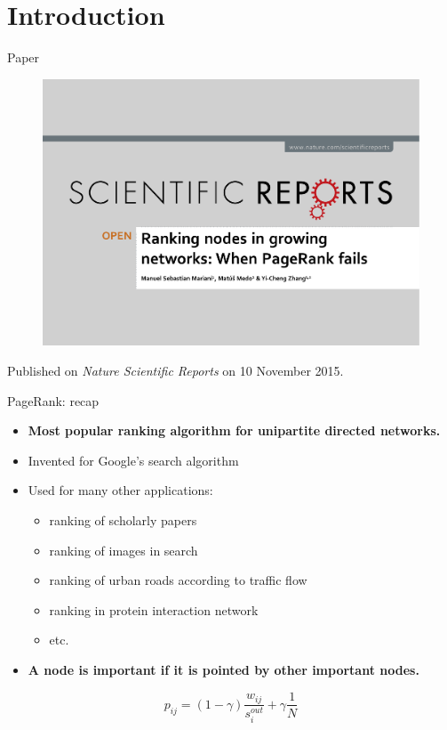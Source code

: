 \section{Introduction}
\begin{frame}{Paper}
    \begin{figure}
        \includegraphics[width=1.0\textwidth]{figures/Header}
    \end{figure}

    Published on \emph{Nature Scientific Reports} on 10 November 2015.
\end{frame}

\begin{frame}{PageRank: recap}
    \begin{itemize}
        \item \textbf{Most popular ranking algorithm for unipartite directed networks.}
        \item Invented for Google's search algorithm
        \item Used for many other applications:
        \begin{itemize}
            \item ranking of scholarly papers
            \item ranking of images in search
            \item ranking of urban roads according to traffic flow
            \item ranking in protein interaction network
            \item etc.
        \end{itemize}
        \item \textbf{A node is important if it is pointed by other important nodes.}
    \end{itemize}
    \[
        p_{ij} = (1-\gamma) \frac{w_{ij}}{s_i^{out}} + \gamma \frac{1}{N}
    \]
\end{frame}

